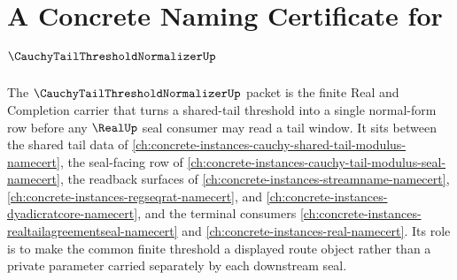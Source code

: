 \chapter{A Concrete Naming Certificate for $\CauchyTailThresholdNormalizerUp$}
\label{ch:concrete-instances-cauchy-tail-threshold-normalizer-namecert}

The $\CauchyTailThresholdNormalizerUp$ packet is the finite Real and Completion carrier that turns a shared-tail threshold into a single normal-form row before any $\RealUp$ seal consumer may read a tail window. It sits between the shared tail data of \autoref{ch:concrete-instances-cauchy-shared-tail-modulus-namecert}, the seal-facing row of \autoref{ch:concrete-instances-cauchy-tail-modulus-seal-namecert}, the readback surfaces of \autoref{ch:concrete-instances-streamname-namecert}, \autoref{ch:concrete-instances-regseqrat-namecert}, and \autoref{ch:concrete-instances-dyadicratcore-namecert}, and the terminal consumers \autoref{ch:concrete-instances-realtailagreementseal-namecert} and \autoref{ch:concrete-instances-real-namecert}. Its role is to make the common finite threshold a displayed route object rather than a private parameter carried separately by each downstream seal.


